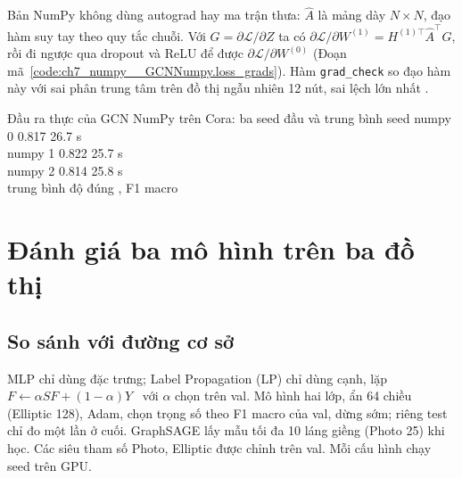 Bản NumPy không dùng autograd hay ma trận thưa: $\hat A$ là mảng dày $N\times N$, đạo hàm suy tay theo quy tắc chuỗi. Với
$G=\partial\mathcal L/\partial Z$ ta có $\partial\mathcal L/\partial W^{(1)}=H^{(1)\top}\hat A^{\top}G$, rồi đi ngược qua dropout
và ReLU để được $\partial\mathcal L/\partial W^{(0)}$ (Đoạn mã~\ref{code:ch7_numpy__GCNNumpy.loss_grads}). Hàm \texttt{grad\_check}
so đạo hàm này với sai phân trung tâm trên đồ thị ngẫu nhiên 12 nút, sai lệch lớn nhất .




\begin{ketqua}{Đầu ra thực của GCN NumPy trên Cora: ba seed đầu và trung bình  seed}
numpy 0 0.817 26.7 s\\
numpy 1 0.822 25.7 s\\
numpy 2 0.814 25.8 s\\
trung bình độ đúng , F1 macro 
\end{ketqua}

\section{Đánh giá ba mô hình trên ba đồ thị}

\subsection{So sánh với đường cơ sở}

MLP chỉ dùng đặc trưng; Label Propagation (LP) chỉ dùng cạnh, lặp $F\leftarrow\alpha SF+(1-\alpha)Y$~\cite{ch7:zhou2004} với $\alpha$
chọn trên val. Mô hình hai lớp, ẩn 64 chiều (Elliptic 128), Adam, chọn trọng số theo F1 macro của val, dừng sớm; riêng test chỉ đo
một lần ở cuối. GraphSAGE lấy mẫu tối đa 10 láng giềng (Photo 25) khi học. Các siêu tham số Photo, Elliptic được chỉnh trên val.
Mỗi cấu hình chạy  seed trên GPU.


